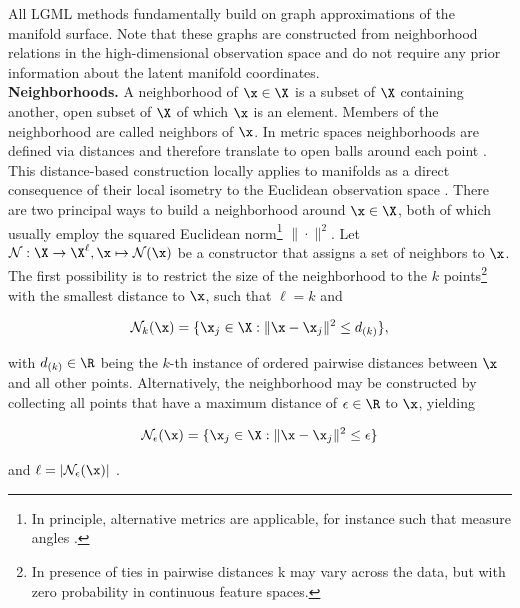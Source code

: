 All LGML methods fundamentally build on graph approximations of the 
manifold surface.
Note that these graphs are constructed from neighborhood relations in the 
high-dimensional observation space and do not require any prior information 
about the latent manifold coordinates.
\\

\textbf{Neighborhoods.} 
A neighborhood of $\x \in \X$ is a subset of $\X$ containing another, open 
subset of $\X$ of which $\x$ is an element.
Members of the neighborhood are called neighbors of $\x$.
In metric spaces neighborhoods are defined via distances and therefore 
translate to open balls around each point \citep{waldmann2014}.
This distance-based construction locally applies to manifolds as a direct 
consequence of their local isometry to the Euclidean observation space 
\citep{mafu2011}.
There are two principal ways to build a neighborhood around $\x \in \X$, 
both of which usually employ the squared Euclidean norm\footnote{
In principle, alternative metrics are applicable, for instance such 
that measure angles \citep{belkinniyogi2004}.
} $\| \cdot \|^2$.
Let $\mathcal{N}: \X \rightarrow \X^{\ell}, \x \mapsto \mathcal{N} (\x)$ be a 
constructor that assigns a set of neighbors to $\x$.
The first possibility is to restrict the size of the neighborhood to the $k$ 
points\footnote{
In presence of ties in pairwise distances k may vary across the data, but with 
zero probability in continuous feature spaces.
} with the smallest distance to $\x$, such that
$\ell = k$ and 

\begin{equation}
  \mathcal{N}_k(\x) = \{\x_j \in \X: \| \x - \x_j \|^2 \leq d_{(k)}\},
  \label{eq-kneighborhood}
\end{equation}

with $d_{(k)} \in \R$ being the $k$-th instance of ordered pairwise distances 
between $\x$ and all other points.
Alternatively, the neighborhood may be constructed by collecting all points that
have a maximum distance of $\epsilon \in \R$ to $\x$, yielding 

\begin{equation}
  \mathcal{N}_{\epsilon} (\x) = \{\x_j \in \X: \| \x - \x_j \|^2 \leq \epsilon\}
  \label{eq-epsneighborhood}
\end{equation}

and $\ell = |\mathcal{N}_{\epsilon} (\x)|$ \citep{heetal2005}.
\\

